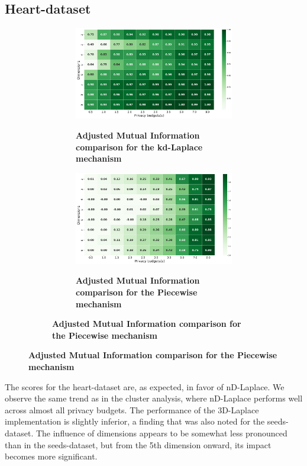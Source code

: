 {\subsection{Heart-dataset}
\begin{figure}[H]
  \centering
  \begin{subfigure}[b]{0.80\textwidth}
    \begin{subfigure}[c]{1\textwidth}
      \caption{\textbf{Adjusted Mutual Information comparison for the kd-Laplace mechanism}}
      \includegraphics[width=1\textwidth]{Results/nd-laplace/nd-Laplace/heart-dataset/ami.png}
      \label{fig:ami_heart-dataset_comparison_kdlaplace_2d}
    \end{subfigure}
    \vfill %
    \begin{subfigure}[c]{1\textwidth}
      \caption{\textbf{Adjusted Mutual Information comparison for the Piecewise mechanism}}
      \includegraphics[width=1\textwidth]{Results/nd-laplace/piecewise/heart-dataset/ami.png}
      \label{fig:ami_heart-dataset_comparison_piecewise_2d}
    \end{subfigure}
  \end{subfigure}
\end{figure}
The scores for the heart-dataset are, as expected, in favor of nD-Laplace. We observe the same trend as in the cluster analysis, where nD-Laplace performs well across almost all privacy budgets. The performance of the 3D-Laplace implementation is slightly inferior, a finding that was also noted for the seeds-dataset. The influence of dimensions appears to be somewhat less pronounced than in the seeds-dataset, but from the 5th dimension onward, its impact becomes more significant.

}
